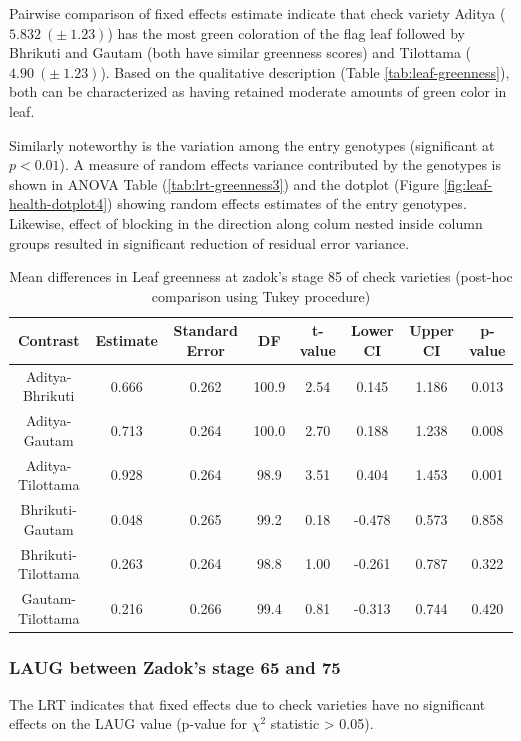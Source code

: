\documentclass[12pt,oneside]{dukestatscithesis} %
\theoremstyle{definition}
\theoremstyle{definition}
\theoremstyle{definition}
\theoremstyle{remark}
\begin{document}
Pairwise comparison of fixed effects estimate indicate that check
variety Aditya (\(5.832\ (\pm\ 1.23)\)) has the most green coloration of
the flag leaf followed by Bhrikuti and Gautam (both have similar
greenness scores) and Tilottama (\(4.90\ (\pm\ 1.23)\)). Based on the
qualitative description (Table \ref{tab:leaf-greenness}), both can be
characterized as having retained moderate amounts of green color in
leaf.

Similarly noteworthy is the variation among the entry genotypes
(significant at \(p < 0.01\)). A measure of random effects variance
contributed by the genotypes is shown in ANOVA Table
(\ref{tab:lrt-greenness3}) and the dotplot (Figure
\ref{fig:leaf-health-dotplot4}) showing random effects estimates of the
entry genotypes. Likewise, effect of blocking in the direction along
colum nested inside column groups resulted in significant reduction of
residual error variance.
\begin{table}[H]

\caption{\label{tab:leaf-health-meanconf-tab4}Mean differences in Leaf greenness at zadok's stage 85 of check varieties (post-hoc comparison using Tukey procedure)}
\centering
\begin{tabular}[t]{cccccccc}
\toprule
Contrast & Estimate & Standard Error & DF & t-value & Lower CI & Upper CI & p-value\\
\midrule
Aditya-Bhrikuti & 0.666 & 0.262 & 100.9 & 2.54 & 0.145 & 1.186 & 0.013\\
Aditya-Gautam & 0.713 & 0.264 & 100.0 & 2.70 & 0.188 & 1.238 & 0.008\\
Aditya-Tilottama & 0.928 & 0.264 & 98.9 & 3.51 & 0.404 & 1.453 & 0.001\\
Bhrikuti-Gautam & 0.048 & 0.265 & 99.2 & 0.18 & -0.478 & 0.573 & 0.858\\
Bhrikuti-Tilottama & 0.263 & 0.264 & 98.8 & 1.00 & -0.261 & 0.787 & 0.322\\
Gautam-Tilottama & 0.216 & 0.266 & 99.4 & 0.81 & -0.313 & 0.744 & 0.420\\
\bottomrule
\end{tabular}
\end{table}
\subsubsection{LAUG between Zadok's stage 65 and
75}\label{laug-between-zadoks-stage-65-and-75}

The LRT indicates that fixed effects due to check varieties have no
significant effects on the LAUG value (p-value for \(\chi^2\) statistic
\textgreater{} 0.05).
\end{document}
